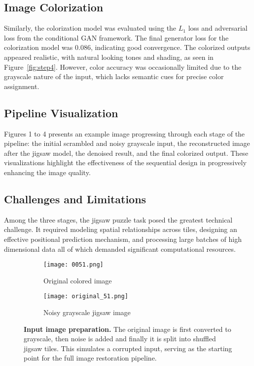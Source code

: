 \documentclass[%
 reprint,
 amsmath,amssymb,
 aps,
]{revtex4-2}
\begin{document}
\subsection{Image Colorization}

Similarly, the colorization model was evaluated using the $L_1$ loss and adversarial loss from the conditional GAN framework. The final generator loss for the colorization model was 0.086, indicating good convergence. The colorized outputs appeared realistic, with natural looking tones and shading, as seen in Figure~\ref{fig:step4}. However, color accuracy was occasionally limited due to the grayscale nature of the input, which lacks semantic cues for precise color assignment.

\subsection{Pipeline Visualization}

Figures 1 to 4 presents an example image progressing through each stage of the pipeline: the initial scrambled and noisy grayscale input, the reconstructed image after the jigsaw model, the denoised result, and the final colorized output. These visualizations highlight the effectiveness of the sequential design in progressively enhancing the image quality.

\subsection{Challenges and Limitations}

Among the three stages, the jigsaw puzzle task posed the greatest technical challenge. It required modeling spatial relationships across tiles, designing an effective positional prediction mechanism, and processing large batches of high dimensional data all of which demanded significant computational resources.





\begin{figure}[H]
    \centering
    \begin{subfigure}[b]{0.45\columnwidth}
        \texttt{[image: 0051.png]}
        \caption{Original colored image}
    \end{subfigure}
    \hfill
    \begin{subfigure}[b]{0.45\columnwidth}
        \texttt{[image: original\_51.png]}
        \caption{Noisy grayscale jigsaw image}
    \end{subfigure}
    \caption{\textbf{Input image preparation.} The original image is first converted to grayscale, then noise is added and finally it is split into shuffled jigsaw tiles. This simulates a corrupted input, serving as the starting point for the full image restoration pipeline.}
    \label{fig:step1}
\end{figure}
\end{document}

